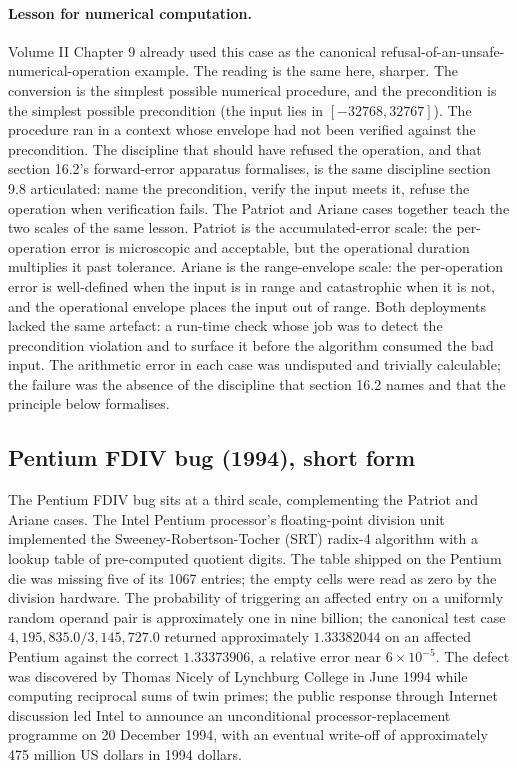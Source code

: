 \paragraph{Lesson for numerical computation.}
Volume II Chapter 9 already used this case as the canonical
refusal-of-an-unsafe-numerical-operation example. The reading is the
same here, sharper. The conversion is the simplest possible numerical
procedure, and the precondition is the simplest possible precondition
(the input lies in $[-32768, 32767]$). The procedure ran in a context
whose envelope had not been verified against the precondition. The
discipline that should have refused the operation, and that section
16.2's forward-error apparatus formalises, is the same discipline
section 9.8 articulated: name the precondition, verify the input
meets it, refuse the operation when verification fails. The Patriot
and Ariane cases together teach the two scales of the same lesson.
Patriot is the accumulated-error scale: the per-operation error is
microscopic and acceptable, but the operational duration multiplies
it past tolerance. Ariane is the range-envelope scale: the
per-operation error is well-defined when the input is in range and
catastrophic when it is not, and the operational envelope places
the input out of range. Both deployments lacked the same artefact:
a run-time check whose job was to detect the precondition violation
and to surface it before the algorithm consumed the bad input. The
arithmetic error in each case was undisputed and trivially
calculable; the failure was the absence of the discipline that
section 16.2 names and that the principle below formalises.

\subsection{Pentium FDIV bug (1994), short form}

The Pentium FDIV bug \cite{paper:coe-tang-pratt-1995,paper:edelman-1997}
sits at a third scale, complementing the Patriot and Ariane cases.
The Intel Pentium processor's floating-point division unit
implemented the Sweeney-Robertson-Tocher (SRT) radix-4 algorithm
with a lookup table of pre-computed quotient digits. The table
shipped on the Pentium die was missing five of its 1067 entries; the
empty cells were read as zero by the division hardware. The
probability of triggering an affected entry on a uniformly random
operand pair is approximately one in nine billion; the canonical
test case $4{,}195{,}835.0 / 3{,}145{,}727.0$ returned approximately
$1.33382044$ on an affected Pentium against the correct
$1.33373906$, a relative error near $6 \times 10^{-5}$. The defect
was discovered by Thomas Nicely of Lynchburg College in June 1994
while computing reciprocal sums of twin primes; the public response
through Internet discussion led Intel to announce an unconditional
processor-replacement programme on 20 December 1994, with an
eventual write-off of approximately 475 million US dollars in
1994 dollars.

